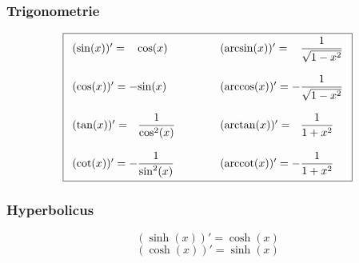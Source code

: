 \subsubsection{Trigonometrie}

\[ \boxed{ \begin{array}{ l @{}l @{\quad\quad\quad}l @{}l }
(\sin(x))' =   &\cos(x)             & \quad (\arcsin(x))' =   & \dfrac{1}{\sqrt{1 - x^2}} \\\\
(\cos(x))' = - &\sin(x)             & \quad (\arccos(x))' = - & \dfrac{1}{\sqrt{1 - x^2}} \\\\
(\tan(x))' =   &\dfrac{1}{\cos^2(x)} & \quad (\arctan(x))' =   & \dfrac{1}{1 + x^2} \\\\
(\cot(x))' = - &\dfrac{1}{\sin^2(x)} & \quad (\arccot(x))' = - & \dfrac{1}{1 + x^2} 
\end{array}} \]

\subsubsection{Hyperbolicus}
\[ \boxed{(\sinh(x))' = \cosh(x)} \]
\[ \boxed{(\cosh(x))' = \sinh(x)} \]

